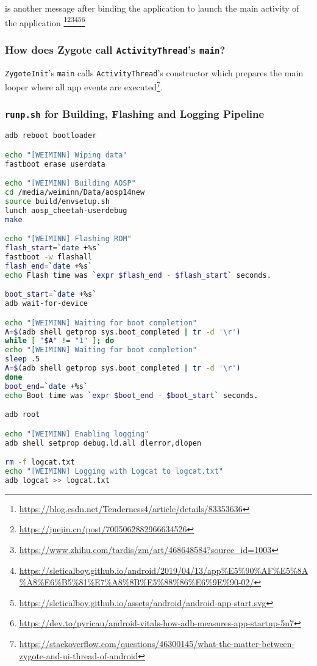  is another message after binding the application to launch the main activity of the application \footnote{\url{https://blog.csdn.net/Tenderness4/article/details/83353636}}\footnote{\url{https://juejin.cn/post/7005062882966634526}}\footnote{\url{https://www.zhihu.com/tardis/zm/art/468648584?source_id=1003}}\footnote{\url{https://sleticalboy.github.io/android/2019/04/13/app\%E5\%90\%AF\%E5\%8A\%A8\%E6\%B5\%81\%E7\%A8\%8B\%E5\%88\%86\%E6\%9E\%90-02/}}\footnote{\url{https://sleticalboy.github.io/assets/android/android-app-start.svg}}\footnote{\url{https://dev.to/pyricau/android-vitals-how-adb-measures-app-startup-5n7}}

\subsubsection{How does Zygote call \texttt{ActivityThread}'s \texttt{main}?}

\texttt{ZygoteInit}'s \texttt{main} calls \texttt{ActivityThread}'s constructor which prepares the main looper where all app events are executed\footnote{\url{https://stackoverflow.com/questions/46300145/what-the-matter-between-zygote-and-ui-thread-of-android}}.

\subsubsection{\texttt{runp.sh} for Building, Flashing and Logging Pipeline}
\begin{lstlisting}[language=bash]
adb reboot bootloader

echo "[WEIMINN] Wiping data"
fastboot erase userdata

echo "[WEIMINN] Building AOSP"
cd /media/weiminn/Data/aosp14new
source build/envsetup.sh
lunch aosp_cheetah-userdebug
make

echo "[WEIMINN] Flashing ROM"
flash_start=`date +%s`
fastboot -w flashall
flash_end=`date +%s`
echo Flash time was `expr $flash_end - $flash_start` seconds.

boot_start=`date +%s`
adb wait-for-device

echo "[WEIMINN] Waiting for boot completion"
A=$(adb shell getprop sys.boot_completed | tr -d '\r')
while [ "$A" != "1" ]; do
echo "[WEIMINN] Waiting for boot completion"
sleep .5
A=$(adb shell getprop sys.boot_completed | tr -d '\r')
done
boot_end=`date +%s`
echo Boot time was `expr $boot_end - $boot_start` seconds.

adb root

echo "[WEIMINN] Enabling logging"
adb shell setprop debug.ld.all dlerror,dlopen

rm -f logcat.txt 
echo "[WEIMINN] Logging with Logcat to logcat.txt"
adb logcat >> logcat.txt
\end{lstlisting}

